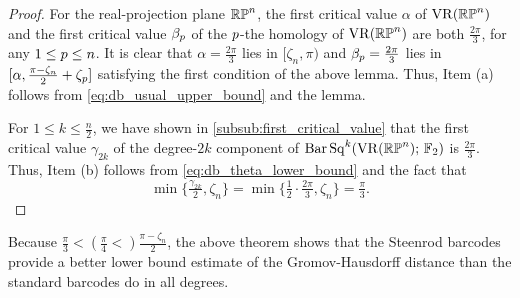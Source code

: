 \begin{proof}
        For the real-projection plane $\mathbb{RP}^n$, the first critical value $\alpha$ of $\operatorname{VR}(\mathbb{RP}^n)$ and the first critical value $\beta_p$ of the $p$-the homology of $\operatorname{VR}(\mathbb{RP}^n)$ are both $\tfrac{2\pi}{3}$, for any $1 \leq p \leq n$. %
        It is clear that $\alpha= \tfrac{2\pi}{3}$ lies in $[\zeta_n, \pi)$ and $\beta_p = \tfrac{2\pi}{3}$ lies in $[\alpha, \tfrac{\pi - \zeta_n}{2}+\zeta_p]$ satisfying the first condition of the above lemma. 
        Thus, Item (a) follows from \cref{eq:db_usual_upper_bound} and the lemma.

        For $1 \leq k \leq \tfrac{n}{2}$, we have shown in \cref{subsub:first_critical_value} that the first critical value $\gamma_{2k}$ of the degree-$2k$ component of $\operatorname{Bar}\operatorname{Sq}^{k}(\operatorname{VR}(\mathbb{RP}^n);\,{\mathbb{F}_2})$ is $\tfrac{2\pi}{3}$. 
        Thus, Item (b) follows from \cref{eq:db_theta_lower_bound} and the fact that
        \[\min\{\tfrac{\gamma_{2k}}{2}, \zeta_n\} = \min\{\tfrac{1}{2}\cdot\tfrac{2\pi}{3}, \zeta_n\} = \tfrac{\pi}{3}.\]
\end{proof}

Because $\tfrac{\pi}{3} < (\tfrac{\pi}{4} <) \tfrac{\pi - \zeta_n}{2}$, the above theorem shows that the Steenrod barcodes provide a better lower bound estimate of the Gromov-Hausdorff distance than the standard barcodes do in all degrees.
